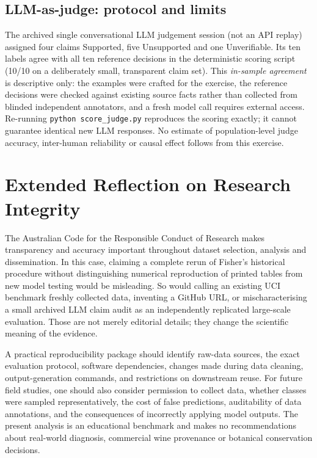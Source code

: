 \documentclass[11pt]{article}
\begin{document}
\subsection{LLM-as-judge: protocol and limits}
The archived single conversational LLM judgement session (not an API replay) assigned four claims Supported, five Unsupported and one Unverifiable. Its ten labels agree with all ten reference decisions in the deterministic scoring script (10/10 on a deliberately small, transparent claim set). This \emph{in-sample agreement} is descriptive only: the examples were crafted for the exercise, the reference decisions were checked against existing source facts rather than collected from blinded independent annotators, and a fresh model call requires external access. Re-running \texttt{python score\_judge.py} reproduces the scoring exactly; it cannot guarantee identical new LLM responses. No estimate of population-level judge accuracy, inter-human reliability or causal effect follows from this exercise.

\section{Extended Reflection on Research Integrity}
The Australian Code for the Responsible Conduct of Research makes transparency and accuracy important throughout dataset selection, analysis and dissemination. In this case, claiming a complete rerun of Fisher's historical procedure without distinguishing numerical reproduction of printed tables from new model testing would be misleading. So would calling an existing UCI benchmark freshly collected data, inventing a GitHub URL, or mischaracterising a small archived LLM claim audit as an independently replicated large-scale evaluation. Those are not merely editorial details; they change the scientific meaning of the evidence.

A practical reproducibility package should identify raw-data sources, the exact evaluation protocol, software dependencies, changes made during data cleaning, output-generation commands, and restrictions on downstream reuse. For future field studies, one should also consider permission to collect data, whether classes were sampled representatively, the cost of false predictions, auditability of data annotations, and the consequences of incorrectly applying model outputs. The present analysis is an educational benchmark and makes no recommendations about real-world diagnosis, commercial wine provenance or botanical conservation decisions.
\end{document}
